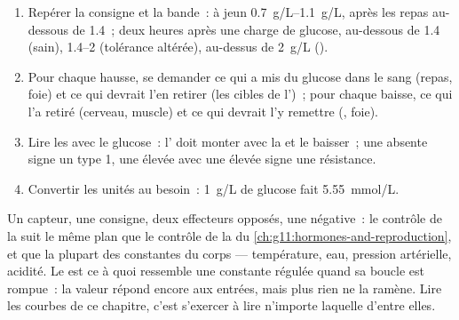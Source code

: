 \begin{method}\label{met:g12:glucose-and-diabetes:read}
\begin{enumerate}
  \item Repérer la consigne et la bande~: à jeun
        \qtyrange{0.7}{1.1}{g/L}, après les repas au-dessous de
        \num{1.4}~; deux heures après une charge de glucose,
        au-dessous de \num{1.4} (sain), \qtyrange{1.4}{2}{}
        (tolérance altérée), au-dessus de \qty{2}{g/L} ().
  \item Pour chaque hausse, se demander ce qui a mis du glucose dans
        le sang (repas, foie) et ce qui devrait l'en retirer (les
        cibles de l')~; pour chaque baisse, ce qui l'a retiré
        (cerveau, muscle) et ce qui devrait l'y remettre (,
        foie).
  \item Lire les  avec le glucose~: l' doit monter
        avec la  et le  baisser~; une  absente
        signe un type 1, une  élevée avec une  élevée
        signe une résistance.
  \item Convertir les unités au besoin~: \qty{1}{g/L} de glucose fait
        \qty{5.55}{mmol/L}.
\end{enumerate}
\end{method}

\begin{remark}\label{rem:g12:glucose-and-diabetes:model}
Un capteur, une consigne, deux effecteurs opposés, une 
négative~: le contrôle de la  suit le même plan que le
contrôle de la  du
\cref{ch:g11:hormones-and-reproduction}, et que la plupart des
constantes du corps --- température, eau, pression artérielle,
acidité. Le  est ce à quoi ressemble une constante régulée
quand sa boucle est rompue~: la valeur répond encore aux entrées, mais
plus rien ne la ramène. Lire les courbes de ce chapitre, c'est
s'exercer à lire n'importe laquelle d'entre elles.
\end{remark}

